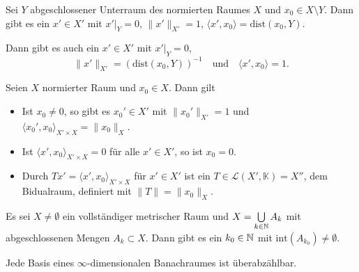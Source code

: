\documentclass{cheat-sheet}
\newcommand{\K}{\mathbb{K}}
\newcommand{\dist}{\mathrm{dist}} %
\begin{document}
\begin{satz}
  Sei $Y$ abgeschlossener Unterraum des normierten Raumes $X$ und $x_0 \in X \setminus Y$. Dann gibt es ein $x' \in X'$ mit $x'|_Y = 0$, $\|x'\|_{X'} = 1$, $\langle x', x_0 \rangle = \dist(x_0, Y)$.
\end{satz}

\begin{bem}
  Dann gibt es auch ein $x' \in X'$ mit $x'|_Y = 0$,
  \[ \|x'\|_{X'} = (\dist(x_0, Y))^{-1} \quad \text{und} \quad \langle x', x_0 \rangle = 1. \]
\end{bem}


\begin{satz}
  Seien $X$ normierter Raum und $x_0 \in X$. Dann gilt
  \begin{itemize}
    \item  Ist $x_0 \not= 0$, so gibt es $x_0' \in X'$ mit $\|x_0'\|_{X'} = 1$ und $\langle x_0', x_0 \rangle_{X' \times X} = \|x_0\|_X$.
    \item Ist $\langle x', x_0 \rangle_{X' \times X} = 0$ für alle $x' \in X'$, so ist $x_0 = 0$.
    \item Durch $Tx' = \langle x', x_0 \rangle_{X' \times X}$ für $x' \in X'$ ist ein $T \in \mathcal{L}(X', \K) = X''$, dem Bidualraum, definiert mit $\|T\| = \|x_0\|_X$.
  \end{itemize}
\end{satz}



\begin{satz}
  Es sei $X \not= \emptyset$ ein vollständiger metrischer Raum und $X = \bigcup_{k \in \N} A_k$ mit abgeschlossenen Mengen $A_k \subset X$. Dann gibt es ein $k_0 \in \mathbb{N}$ mit $\mathrm{int}(A_{k_0}) \not= \emptyset$.
\end{satz}

\begin{kor}
  Jede Basis eines $\infty$-dimensionalen Banachraumes ist überabzählbar.
\end{kor}
\end{document}
